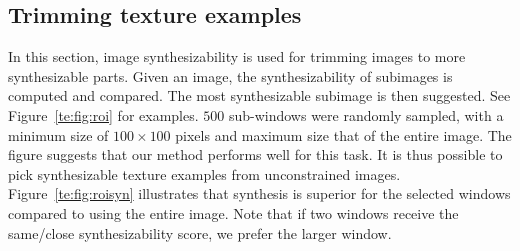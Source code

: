 



\subsection{Trimming texture examples}
In this section, image synthesizability is used for trimming images to
more synthesizable parts. Given an image, the synthesizability of
subimages is computed and compared. The most synthesizable subimage is
then suggested. See Figure~\ref{te:fig:roi} for examples. $500$ sub-windows
were randomly sampled, with a minimum size of $100 \times 100$ pixels
and maximum size that of the entire image.  The figure suggests that
our method performs well for this task. It is thus possible to pick
synthesizable texture examples from unconstrained images.
Figure~\ref{te:fig:roisyn} illustrates that synthesis is superior for the
selected windows compared to using the entire image.  Note that if two
windows receive the same/close synthesizability score, we prefer the
larger window.



